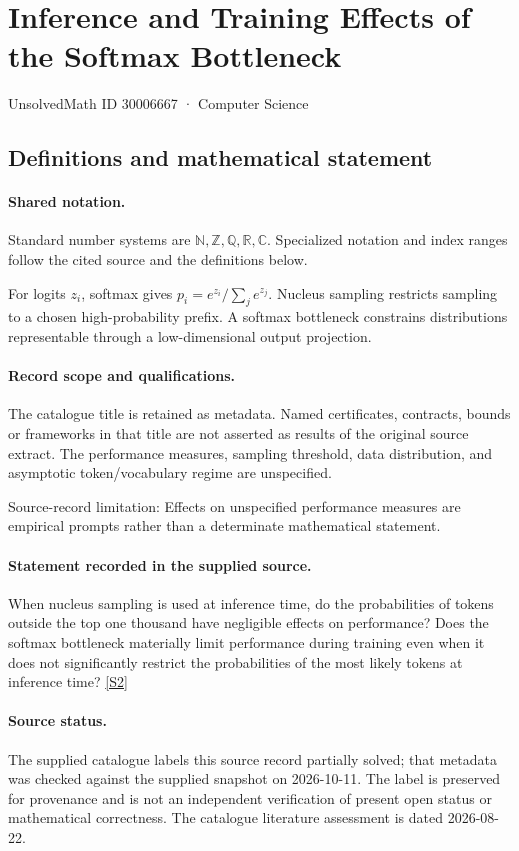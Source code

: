 \documentclass[11pt]{article}
\newcommand{\sref}[2]{\hyperlink{source:#1:#2}{[S#2]}}
\begin{document}
\setcounter{section}{30006666}
\section{Inference and Training Effects of the Softmax Bottleneck}\label{30006667}
{\small\sffamily UnsolvedMath ID 30006667 · Computer Science}
\subsection{Definitions and mathematical statement}

\paragraph{Shared notation.}Standard number systems are $\mathbb N,\mathbb Z,\mathbb Q,\mathbb R,\mathbb C$. Specialized notation and index ranges follow the cited source and the definitions below.


For logits $z_i$, softmax gives $p_i=e^{z_i}/\sum_j e^{z_j}$. Nucleus sampling restricts sampling to a chosen high-probability prefix. A softmax bottleneck constrains distributions representable through a low-dimensional output projection.
\paragraph{Record scope and qualifications.}
The catalogue title is retained as metadata. Named certificates, contracts, bounds or frameworks in that title are not asserted as results of the original source extract.
The performance measures, sampling threshold, data distribution, and asymptotic token/vocabulary regime are unspecified.

Source-record limitation: Effects on unspecified performance measures are empirical prompts rather than a determinate mathematical statement.
\paragraph{Statement recorded in the supplied source.}
When nucleus sampling is used at inference time, do the probabilities of tokens outside the top one thousand have negligible effects on performance? Does the softmax bottleneck materially limit performance during training even when it does not significantly restrict the probabilities of the most likely tokens at inference time? \sref{30006667}{2}
\paragraph{Source status.}
The supplied catalogue labels this source record partially solved; that metadata was checked against the supplied snapshot on 2026-10-11. The label is preserved for provenance and is not an independent verification of present open status or mathematical correctness. The catalogue literature assessment is dated 2026-08-22.
\end{document}
